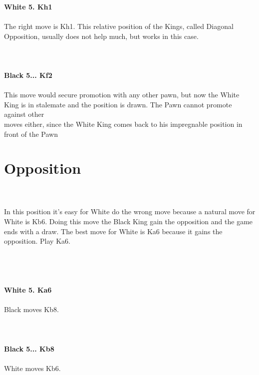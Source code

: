 \documentclass{article}
\begin{document}
\\

\\
\\
\textbf{White 5. Kh1}\\
\\
The right move is Kh1. This relative position of the Kings, called Diagonal Opposition, usually does not help much, but works in this case.\\
\\

\\
\\
\textbf{Black 5... Kf2}\\
\\
This move would secure promotion with any other pawn, but now the White King is in stalemate and the position is drawn. The Pawn cannot promote against other\\moves either, since the White King comes back to his impregnable position in front of the Pawn\section{ Opposition}

\\
\\
In this position it's easy for White do the wrong move because a natural move for White is Kb6. Doing this move the Black King gain the opposition and the game ends with a draw. The best move for White is Ka6 because it gains the opposition. Play Ka6.\\\\
\\

\\
\\
\textbf{White 5. Ka6}\\
\\
Black moves Kb8.\\
\\

\\
\\
\textbf{Black 5... Kb8}\\
\\
White moves Kb6.\\
\\
\end{document}
